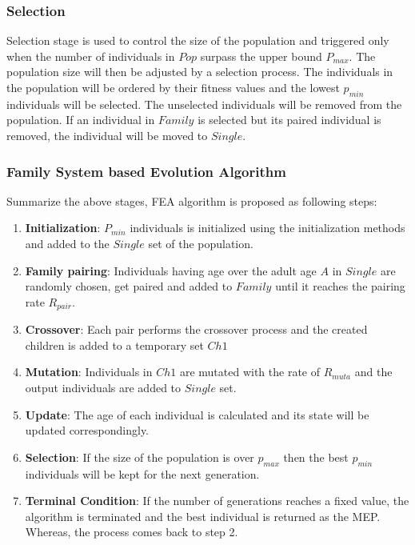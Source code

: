 \documentclass[final]{elsarticle}
\begin{document}
\subsubsection{Selection}

Selection stage is used to control the size of the population and triggered only when the number of individuals in $Pop$ surpass the upper bound $P_{max}$. The population size will then be adjusted by a selection process. The individuals in the population will be ordered by their fitness values and the lowest $p_{min}$ individuals will be selected. The unselected individuals will be removed from the population. If an individual in $Family$ is selected but its paired individual is removed, the individual will be moved to $Single$.

\subsubsection{Family System based Evolution Algorithm}

Summarize the above stages, FEA algorithm is proposed as following steps:

\begin{enumerate}
	\item \textbf{Initialization}: $P_{min}$ individuals is initialized using the initialization methods and added to the $Single$ set of the population.
	\item \textbf{Family pairing}: Individuals having age over the adult age $A$ in $Single$ are randomly chosen, get paired and added to $Family$ until it reaches the pairing rate $R_{pair}$.
	\item \textbf{Crossover}: Each pair performs the crossover process and the created children is added to a temporary set $Ch1$
	\item \textbf{Mutation}: Individuals in $Ch1$ are mutated with the rate of $R_{muta}$ and the output individuals are added to $Single$ set.
	\item \textbf{Update}: The age of each individual is calculated and its state will be updated correspondingly.
	\item \textbf{Selection}: If the size of the population is over $p_{max}$ then the best $p_{min}$ individuals will be kept for the next generation.
	\item \textbf{Terminal Condition}: If the number of generations reaches a fixed value, the algorithm is terminated and the best individual is returned as the MEP. Whereas, the process comes back to step 2.
\end{enumerate}
\end{document}
